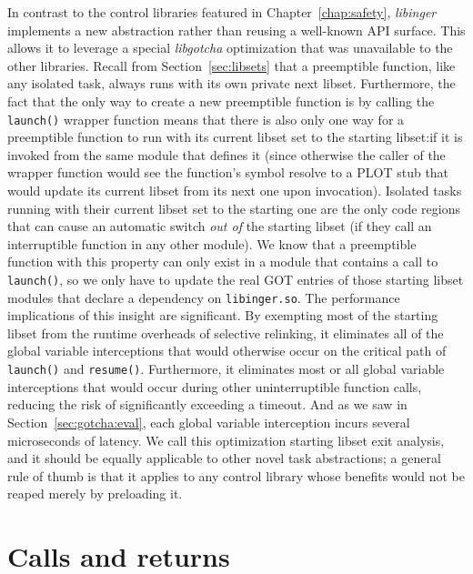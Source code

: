 In contrast to the control libraries featured in Chapter~\ref{chap:safety},
\textit{libinger} implements a new abstraction rather than reusing a well-known API
surface.  This allows it to leverage a special \textit{libgotcha} optimization that
was unavailable to the other libraries.  Recall from Section~\ref{sec:libsets} that a
preemptible function, like any isolated task, always runs with its own private next
libset.  Furthermore, the fact that the only way to create a new preemptible function
is by calling the \texttt{launch()} wrapper function means that there is also only
one way for a preemptible function to run with its current libset set to the starting
libset:\@ if it is invoked from the same module that defines it (since otherwise the
caller of the wrapper function would see the function's symbol resolve to a PLOT stub
that would update its current libset from its next one upon invocation).  Isolated
tasks running with their current libset set to the starting one are the only code
regions that can cause an automatic switch \textit{out of} the starting libset (if
they call an interruptible function in any other module).  We know that a preemptible
function with this property can only exist in a module that contains a call to
\texttt{launch()}, so we only have to update the real GOT entries of those starting
libset modules that declare a dependency on \texttt{libinger.so}.  The performance
implications of this insight are significant.  By exempting most of the starting
libset from the runtime overheads of selective relinking, it eliminates all of the
global variable interceptions that would otherwise occur on the critical path of
\texttt{launch()} and \texttt{resume()}.  Furthermore, it eliminates most or all
global variable interceptions that would occur during other uninterruptible function
calls, reducing the risk of significantly exceeding a timeout.  And as we saw in
Section~\ref{sec:gotcha:eval}, each global variable interception incurs several
microseconds of latency.  We call this optimization starting libset exit analysis,
and it should be equally applicable to other
novel task abstractions; a general rule of thumb is that it applies to any control
library whose benefits would not be reaped merely by preloading it.


\section{Calls and returns}
\label{sec:libinger:jumps}

